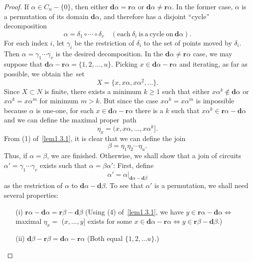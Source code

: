 \documentclass{surv-l}
\numberwithin{equation}{section}
\numberwithin{table}{section}
\numberwithin{figure}{section}
\theoremstyle{plain}
\theoremstyle{definition}
\begin{document}
\begin{proof} If $\alpha\in C_{n}-\{0\}$, then either
$\mathbf{d}\alpha=\mathbf{r}\alpha$ or $\mathbf{d}\alpha\neq
\mathbf{r}\alpha$. In the former case, $\alpha$ is a
permutation of its domain $\mathbf{d}\alpha$, and
therefore has a disjoint ``cycle'' decomposition
\[
\alpha=\delta_{1}\circ\cdots \circ\delta_{v}\quad (\mathrm{each}\ \delta_{i}\ \mathrm{is\ a\
cycle\ on}\ \mathbf{d}\alpha).
\]
For each index $i$, let $\gamma_{i}$ be the restriction of
$\delta_{i}$ to the set of points moved by $\delta_{i}$. Then
$\alpha=\gamma_{1}\cdots\gamma_{v}$ is the desired decomposition.
In the $\mathbf{d}\alpha\neq \mathbf{r}\alpha$ case, we may
suppose that $\mathbf{d}\alpha-\mathbf{r}\alpha=\{1,2,\ldots,
u\}$. Picking $x\in \mathbf{d}\alpha-\mathbf{r}\alpha$ and
iterating, as far as possible, we obtain the~set
\[
X=\{x,x\alpha,x\alpha^{2},\ldots\}.
\]
Since $X\subset N$ is finite, there exists a minimum $k\geq 1$
such that either $x\alpha^{k}\not\in \mathbf{d}\alpha$ or
$x\alpha^{k}=x\alpha^{m}$ for minimum $m>k$. But since the case
$x\alpha^{k}=x\alpha^{m}$ is impossible because $\alpha$ is
one-one, for each $ x\in \mathbf{d}\alpha-\mathbf{r}\alpha$ there
is a $k$ such that $x\alpha^{k}\in
\mathbf{r}\alpha-\mathbf{d}\alpha$ and we can define the maximal
proper~path
\[
\eta_{x}=(x, x\alpha,\ldots, x\alpha^{k}].
\]
From (1) of~\ref{lem1.3.1}, it is clear that we can define the
join
\[
\beta=\eta_{1}\eta_{2}\cdots\eta_{u}.
\]
Thus, if $\alpha=\beta$, we are finished. Otherwise, we shall
show that a join of circuits
$\alpha'=\gamma_{1}\cdots\gamma_{v}$ exists such that
$\alpha=\beta\alpha'$: First, define
\[
\alpha'=\alpha|_{\mathbf{d}\alpha-\mathbf{d}\beta}
\]
as the restriction of $\alpha$ to
$\mathbf{d}\alpha-\mathbf{d}\beta$. To see that $\alpha'$ is a
permutation, we shall need several properties:
\begin{enumerate}
\item[(i)] $\mathbf{r}\alpha-\mathbf{d}\alpha=\mathbf{r}\beta-\mathbf{d}\beta$
(Using (4) of~\ref{lem1.3.1}, we have $ y\in
\mathbf{r}\alpha-\mathbf{d}\alpha\Leftrightarrow$ maximal
$\eta_{x}=$ ($x,\ldots, y]$ exists for some $x\in
\mathbf{d}\alpha-\mathbf{r}\alpha\Leftrightarrow y\in
\mathbf{r}\beta-\mathbf{d}\beta.$)

\item[(ii)] $\mathbf{d}\beta-\mathbf{r}\beta=\mathbf{d}\alpha-\mathbf{r}\alpha$
(Both equal $\{1,2,\ldots u\}.$)


\end{enumerate}
\end{proof}
\end{document}
